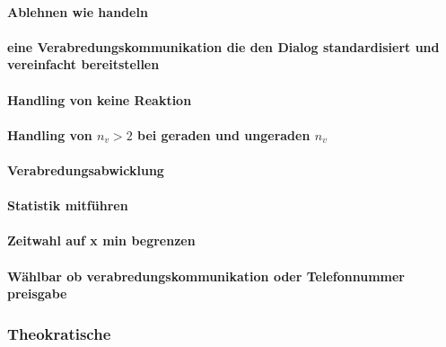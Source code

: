 \paragraph{Ablehnen wie handeln}
\vspace{3cm} 

\paragraph{eine Verabredungskommunikation die den Dialog standardisiert und vereinfacht bereitstellen}
\vspace{3cm} 

\paragraph{Handling von keine Reaktion}
\vspace{3cm} 

\paragraph{Handling von $n_v>2$ bei geraden und ungeraden $n_v$}
\vspace{3cm} 

\paragraph{Verabredungsabwicklung}
\vspace{3cm} 

\paragraph{Statistik mitführen}
\vspace{3cm} 

\paragraph{Zeitwahl auf x min begrenzen}
\vspace{3cm} 

\paragraph{Wählbar ob verabredungskommunikation oder Telefonnummer preisgabe}
\vspace{3cm} 

\subsubsection{Theokratische}


